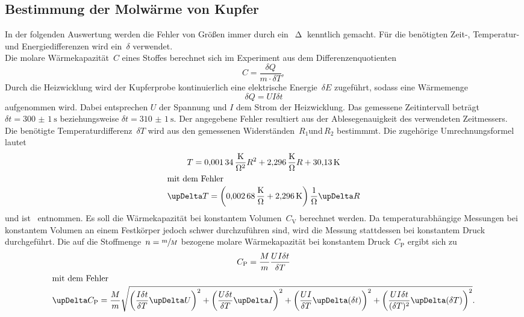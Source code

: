 \subsection{Bestimmung der Molwärme von Kupfer}
In der folgenden Auswertung werden die Fehler von Größen immer durch
ein~$\upDelta$ kenntlich gemacht. Für die benötigten Zeit-, Temperatur- und
Energiedifferenzen wird ein~$\delta$ verwendet.\\
\newline
Die molare Wärmekapazität~$C$ eines Stoffes berechnet sich im Experiment aus
dem Differenzenquotienten
\begin{equation}
  C=\frac{\delta Q}{m \cdot \delta T},
\end{equation}
Durch die Heizwicklung wird der Kupferprobe kontinuierlich eine elektrische Energie~$\delta E$
zugeführt, sodass eine Wärmemenge
\begin{equation}
  \delta Q = UI\delta t
\end{equation}
aufgenommen wird. Dabei entsprechen $U$ der Spannung und $I$ dem Strom der Heizwicklung.
Das gemessene Zeitintervall beträgt $\delta t=\SI{300(1)}{\second}$ beziehungsweise $\delta t=\SI{310(1)}{\second}$.
Der angegebene Fehler resultiert aus der Ablesegenauigkeit des verwendeten Zeitmessers. Die benötigte
Temperaturdifferenz~$\delta T$ wird aus den gemessenen Widerständen~$R_1 \text{und}\, R_2$ bestimmmt.
Die zugehörige Umrechnungsformel lautet
\begin{gather}
  T=\SI{0.00134}{\kelvin\per\ohm\squared}R^2+\SI{2.296}{\kelvin\per\ohm}R+\SI{30.13}{\kelvin} \\
  \shortintertext{mit dem Fehler}
  \upDelta T=\left(\SI{0.00268}{\kelvin\per\ohm}+\SI{2.296}{\kelvin}\right)\SI{}{\per\ohm}\upDelta R
\end{gather}
und ist~\cite{anleitung} entnommen. Es soll die Wärmekapazität bei konstantem
Volumen~$C_{\mathrm{V}}$ berechnet werden. Da temperaturabhängige Messungen bei
konstantem Volumen an einem Festkörper jedoch schwer durchzuführen sind, wird
die Messung stattdessen bei konstantem Druck durchgeführt.
Die auf die Stoffmenge~$n=\sfrac{m}{M}$ bezogene molare Wärmekapazität bei
konstantem Druck~$C_{\mathrm{P}}$ ergibt sich zu
\begin{gather}
  C_{\mathrm{P}}=\frac{M}{m}\frac{UI\delta t}{\delta T}\\
  \intertext{mit dem Fehler}
  \upDelta C_{\mathrm{P}}=\frac{M}{m}\sqrt{\left(\frac{I\delta t}{\delta T}\upDelta U\right)^2+\left(\frac{U\delta t}{\delta T}\upDelta I\right)^2+\left(\frac{UI}{\delta T}\upDelta(\delta t)\right)^2+\left(\frac{UI\delta t}{(\delta T)^2}\upDelta(\delta T)\right)^2}.
\end{gather}
